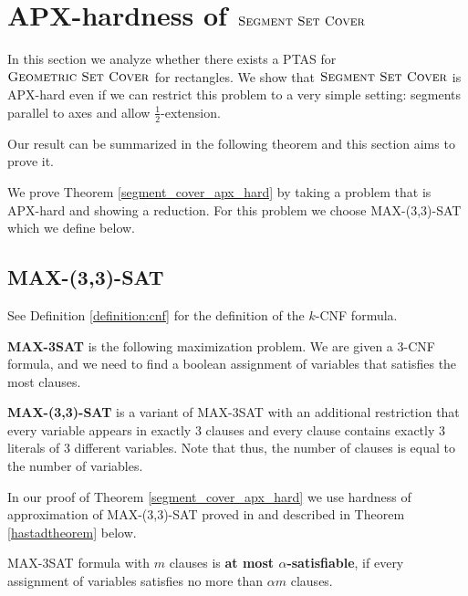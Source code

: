 \chapter{APX-hardness of $\textsc{Segment Set Cover}$}
\newcommand{\setCoverInstance}{(\points, \sets)}
\newcommand{\true}{\texttt{true}}
\newcommand{\false}{\texttt{false}}
\newcommand{\opt}{\mathsf{opt}}
\newcommand{\approximate}{\mathsf{approx}^{*}}

\label{chapter:segment_apx}

In this section we analyze whether there exists 
a PTAS for $\textsc{Geometric Set Cover}$ for rectangles.
We show that $\textsc{Segment Set Cover}$
is APX-hard even if we can restrict this problem
to a very simple setting:
segments parallel to axes and allow $\frac{1}{2}$-extension.

Our result can be summarized in the following
theorem and this section aims to prove it.

\segmentCoverApxHard*

We prove Theorem \ref{segment_cover_apx_hard}
by taking a problem that is APX-hard
and showing a reduction.
For this problem we choose
MAX-(3,3)-SAT which we define below.

\section{MAX-(3,3)-SAT}

See Definition \ref{definition:cnf}
for the definition of the $k$-CNF formula.

\begin{defi}
\textbf{MAX-3SAT} is the following maximization problem. We are given a 3-CNF
formula, and we need to find a boolean assignment of variables
that satisfies the most clauses.
\end{defi}

\begin{defi}
\textbf{MAX-(3,3)-SAT} is a variant of MAX-3SAT with an additional
restriction that every variable appears in exactly 3 clauses
and every clause contains exactly 3 literals of 3 different variables.
Note that thus, the number of clauses is equal to the number of variables.
\end{defi}

In our proof of Theorem \ref{segment_cover_apx_hard} we use
hardness of approximation of MAX-(3,3)-SAT proved
in \cite{hastad} and described in
Theorem \ref{hastadtheorem} below.

\begin{defi}
MAX-3SAT formula with $m$ clauses is \textbf{at most $\alpha$-satisfiable}, if
every assignment of variables satisfies no more than $\alpha m$
clauses. 
\end{defi}

